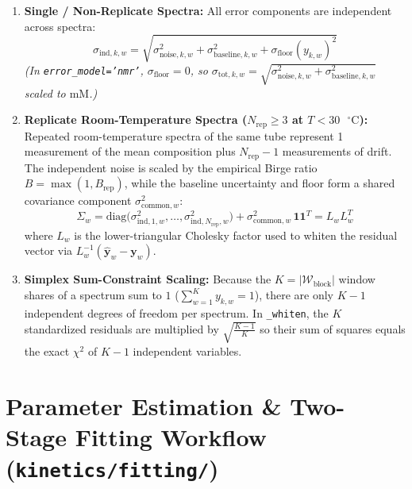 \documentclass[11pt,a4paper]{article}
\let\origsection\section
\renewcommand{\section}{\clearpage\origsection}
\begin{document}
\begin{enumerate}[leftmargin=1.8em]
    \item \textbf{Single / Non-Replicate Spectra:}
    All error components are independent across spectra:
    \begin{equation}
    \sigma_{\text{ind}, k, w} = \sqrt{ \sigma_{\text{noise}, k, w}^2 + \sigma_{\text{baseline}, k, w}^2 + \sigma_{\text{floor}}(y_{k,w})^2 }
    \end{equation}
    \emph{(In \texttt{error\_\allowbreak{}model='nmr'}, $\sigma_{\text{floor}} = 0$, so $\sigma_{\text{tot}, k, w} = \sqrt{\sigma_{\text{noise}, k, w}^2 + \sigma_{\text{baseline}, k, w}^2}$ scaled to $\text{mM}$.)}

    \item \textbf{Replicate Room-Temperature Spectra ($N_{\text{rep}} \ge 3$ at $T < 30\text{ }^\circ\text{C}$):}
    Repeated room-temperature spectra of the same tube represent 1 measurement of the mean composition plus $N_{\text{rep}} - 1$ measurements of drift. The independent noise is scaled by the empirical Birge ratio $B = \max(1, B_{\text{rep}})$, while the baseline uncertainty and floor form a shared covariance component $\sigma_{\text{common}, w}^2$:
    \begin{equation}
    \Sigma_w = \text{diag}\big(\sigma_{\text{ind}, 1, w}^2, \dots, \sigma_{\text{ind}, N_{\text{rep}}, w}^2\big) + \sigma_{\text{common}, w}^2 \, \mathbf{1}\mathbf{1}^T = L_w L_w^T
    \end{equation}
    where $L_w$ is the lower-triangular Cholesky factor used to whiten the residual vector via $L_w^{-1} (\hat{\mathbf{y}}_w - \mathbf{y}_w)$.

    \item \textbf{Simplex Sum-Constraint Scaling:}
    Because the $K = |\mathcal{W}_{\text{block}}|$ window shares of a spectrum sum to $1$ ($\sum_{w=1}^K y_{k,w} = 1$), there are only $K - 1$ independent degrees of freedom per spectrum. In \texttt{\_\allowbreak{}whiten}, the $K$ standardized residuals are multiplied by $\sqrt{\frac{K - 1}{K}}$ so their sum of squares equals the exact $\chi^2$ of $K - 1$ independent variables.
\end{enumerate}


\section{Parameter Estimation \& Two-Stage Fitting Workflow (\texttt{kinetics/\allowbreak{}fitting/\allowbreak{}})}
\end{document}
